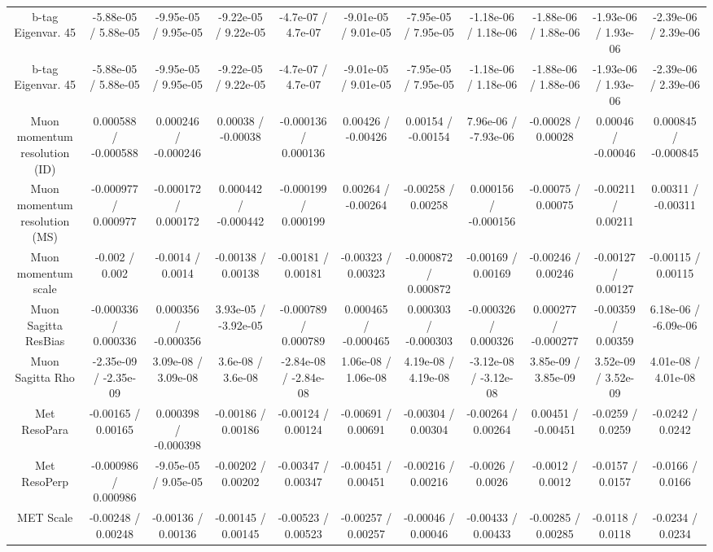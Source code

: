 \begin{table}[htbp]
\begin{center}
\begin{tabular}{|c|c|c|c|c|c|c|c|c|c|c|}
  b-tag Eigenvar. 45 & -5.88e-05 / 5.88e-05 & -9.95e-05 / 9.95e-05 & -9.22e-05 / 9.22e-05 & -4.7e-07 / 4.7e-07 & -9.01e-05 / 9.01e-05 & -7.95e-05 / 7.95e-05 & -1.18e-06 / 1.18e-06 & -1.88e-06 / 1.88e-06 & -1.93e-06 / 1.93e-06 & -2.39e-06 / 2.39e-06 \\ 
  b-tag Eigenvar. 45 & -5.88e-05 / 5.88e-05 & -9.95e-05 / 9.95e-05 & -9.22e-05 / 9.22e-05 & -4.7e-07 / 4.7e-07 & -9.01e-05 / 9.01e-05 & -7.95e-05 / 7.95e-05 & -1.18e-06 / 1.18e-06 & -1.88e-06 / 1.88e-06 & -1.93e-06 / 1.93e-06 & -2.39e-06 / 2.39e-06 \\ 
  Muon momentum resolution (ID) & 0.000588 / -0.000588 & 0.000246 / -0.000246 & 0.00038 / -0.00038 & -0.000136 / 0.000136 & 0.00426 / -0.00426 & 0.00154 / -0.00154 & 7.96e-06 / -7.93e-06 & -0.00028 / 0.00028 & 0.00046 / -0.00046 & 0.000845 / -0.000845 \\ 
  Muon momentum resolution (MS) & -0.000977 / 0.000977 & -0.000172 / 0.000172 & 0.000442 / -0.000442 & -0.000199 / 0.000199 & 0.00264 / -0.00264 & -0.00258 / 0.00258 & 0.000156 / -0.000156 & -0.00075 / 0.00075 & -0.00211 / 0.00211 & 0.00311 / -0.00311 \\ 
  Muon momentum scale & -0.002 / 0.002 & -0.0014 / 0.0014 & -0.00138 / 0.00138 & -0.00181 / 0.00181 & -0.00323 / 0.00323 & -0.000872 / 0.000872 & -0.00169 / 0.00169 & -0.00246 / 0.00246 & -0.00127 / 0.00127 & -0.00115 / 0.00115 \\ 
  Muon Sagitta ResBias & -0.000336 / 0.000336 & 0.000356 / -0.000356 & 3.93e-05 / -3.92e-05 & -0.000789 / 0.000789 & 0.000465 / -0.000465 & 0.000303 / -0.000303 & -0.000326 / 0.000326 & 0.000277 / -0.000277 & -0.00359 / 0.00359 & 6.18e-06 / -6.09e-06 \\ 
  Muon Sagitta Rho & -2.35e-09 / -2.35e-09 & 3.09e-08 / 3.09e-08 & 3.6e-08 / 3.6e-08 & -2.84e-08 / -2.84e-08 & 1.06e-08 / 1.06e-08 & 4.19e-08 / 4.19e-08 & -3.12e-08 / -3.12e-08 & 3.85e-09 / 3.85e-09 & 3.52e-09 / 3.52e-09 & 4.01e-08 / 4.01e-08 \\ 
  Met ResoPara & -0.00165 / 0.00165 & 0.000398 / -0.000398 & -0.00186 / 0.00186 & -0.00124 / 0.00124 & -0.00691 / 0.00691 & -0.00304 / 0.00304 & -0.00264 / 0.00264 & 0.00451 / -0.00451 & -0.0259 / 0.0259 & -0.0242 / 0.0242 \\ 
  Met ResoPerp & -0.000986 / 0.000986 & -9.05e-05 / 9.05e-05 & -0.00202 / 0.00202 & -0.00347 / 0.00347 & -0.00451 / 0.00451 & -0.00216 / 0.00216 & -0.0026 / 0.0026 & -0.0012 / 0.0012 & -0.0157 / 0.0157 & -0.0166 / 0.0166 \\ 
  MET Scale & -0.00248 / 0.00248 & -0.00136 / 0.00136 & -0.00145 / 0.00145 & -0.00523 / 0.00523 & -0.00257 / 0.00257 & -0.00046 / 0.00046 & -0.00433 / 0.00433 & -0.00285 / 0.00285 & -0.0118 / 0.0118 & -0.0234 / 0.0234 \\ 

\end{tabular}
\end{center}
\end{table}

